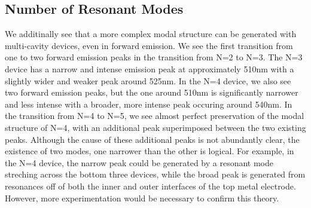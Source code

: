 \documentclass{report}
\begin{document}
        \subsection{Number of Resonant Modes} \label{numModes}
        We additinally see that a more complex modal structure can be generated with multi-cavity devices, even in forward emission. We see the first transition from one to two forward emission peaks in the transition from N=2 to N=3. The N=3 device has a narrow and intense emission peak at approximately 510nm with a slightly wider and weaker peak around 525nm. In the N=4 device, we also see two forward emission peaks, but the one around 510nm is significantly narrower and less intense with a broader, more intense peak occuring around 540nm. In the transition from N=4 to N=5, we see almost perfect preservation of the modal structure of N=4, with an additional peak superimposed between the two existing peaks. Although the cause of these additional peaks is not abundantly clear, the existence of two modes, one narrower than the other is logical. For example, in the N=4 device, the narrow peak could be generated by a resonant mode streching across the bottom three devices, while the broad peak is generated from resonances off of both the inner and outer interfaces of the top metal electrode. However, more experimentation would be necessary to confirm this theory.
\end{document}
